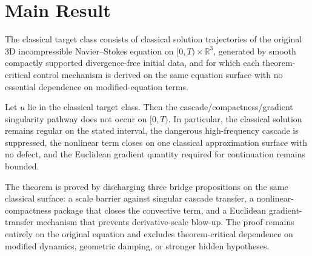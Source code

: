 \section{Main Result}

\begin{definition}
The classical target class consists of classical solution trajectories of the original 3D incompressible Navier--Stokes equation on \([0,T)\times\mathbb{R}^3\), generated by smooth compactly supported divergence-free initial data, and for which each theorem-critical control mechanism is derived on the same equation surface with no essential dependence on modified-equation terms.
\end{definition}

\begin{theorem}
\label{thm:classical-closure}
Let \(u\) lie in the classical target class. Then the cascade/compactness/gradient singularity pathway does not occur on \([0,T)\). In particular, the classical solution remains regular on the stated interval, the dangerous high-frequency cascade is suppressed, the nonlinear term closes on one classical approximation surface with no defect, and the Euclidean gradient quantity required for continuation remains bounded.
\end{theorem}

The theorem is proved by discharging three bridge propositions on the same classical surface: a scale barrier against singular cascade transfer, a nonlinear-compactness package that closes the convective term, and a Euclidean gradient-transfer mechanism that prevents derivative-scale blow-up. The proof remains entirely on the original equation and excludes theorem-critical dependence on modified dynamics, geometric damping, or stronger hidden hypotheses.
